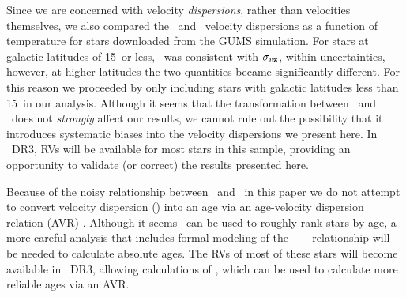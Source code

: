 Since we are concerned with velocity {\it dispersions}, rather than velocities
themselves, we also compared the \vb\ and \vz\ velocity dispersions as a
function of temperature for
stars downloaded from the GUMS simulation.
For stars at galactic latitudes of 15\degrees\ or less, \sigmavb\ was
consistent with $\sigma_{v{\bf z}}$, within uncertainties, however, at higher
latitudes the two quantities became significantly different.
For this reason we proceeded by only including stars with galactic latitudes
less than 15\degrees\ in our analysis.
Although it seems that the transformation between \vz\ and \vb\ does not {\it
strongly} affect our results, we cannot rule out the possibility that it
introduces systematic biases into the velocity dispersions we present here.
In \gaia\ DR3, RVs will be available for most stars in this sample, providing
an opportunity to validate (or correct) the results presented here.



Because of the noisy relationship between \vb\ and \vz\, in this paper we do
not attempt to convert velocity dispersion (\sigmavb) into an age via an
age-velocity dispersion relation (AVR) \citep[\eg][]{holmberg2009}.
Although it seems \sigmavb\ can be used to roughly rank stars by age, a more
careful analysis that includes formal modeling of the \vb\ -- \vz\
relationship will be needed to calculate absolute ages.
The RVs of most of these stars will become available in \Gaia\ DR3, allowing
calculations of \vz, which can be used to calculate more reliable ages via an
AVR.


